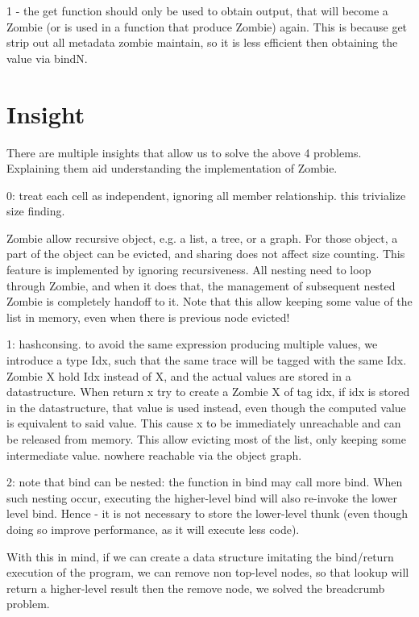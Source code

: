 \documentclass[acmsmall]{acmart}
\begin{document}
	1 - the get function should only be used to obtain output, that will become a Zombie (or is used in a function that produce Zombie) again. This is because get strip out all metadata zombie maintain, so it is less efficient then obtaining the value via bindN.

	\section{Insight}
	There are multiple insights that allow us to solve the above 4 problems. Explaining them aid understanding the implementation of Zombie.
	
	0: treat each cell as independent, ignoring all member relationship.
	this trivialize size finding.
	
	Zombie allow recursive object, e.g. a list, a tree, or a graph.
	For those object, a part of the object can be evicted, and sharing does not affect size counting.
	This feature is implemented by ignoring recursiveness. All nesting need to loop through Zombie, and when it does that, the management of subsequent nested Zombie is completely handoff to it.
	Note that this allow keeping some value of the list in memory, even when there is previous node evicted!
	
	1: hashconsing. to avoid the same expression producing multiple values, we introduce a type Idx, such that the same trace will be tagged with the same Idx.
	Zombie X hold Idx instead of X, and the actual values are stored in a datastructure.
	When return x try to create a Zombie X of tag idx, if idx is stored in the datastructure, that value is used instead, even though the computed value is equivalent to said value. This cause x to be immediately unreachable and can be released from memory. This allow evicting most of the list, only keeping some intermediate value. nowhere reachable via the object graph.
	
	2: note that bind can be nested: the function in bind may call more bind. When such nesting occur, executing the higher-level bind will also re-invoke the lower level bind. Hence - it is not necessary to store the lower-level thunk (even though doing so improve performance, as it will execute less code).
	
	With this in mind, if we can create a data structure imitating the bind/return execution of the program, we can remove non top-level nodes, so that lookup will return a higher-level result then the remove node, we solved the breadcrumb problem.
	
\end{document}
